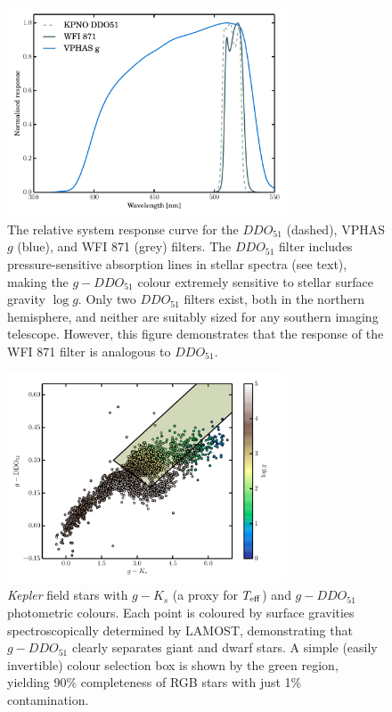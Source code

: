\documentclass[a4paper]{article}
\begin{document}
\begin{SupportingMaterial}

\begin{figure}
\includegraphics[width=8.3cm,angle=0,clip=true]{filter-response}
\caption{\label{image1} The relative system response curve for the $DDO_{51}$ (dashed), VPHAS $g$ (blue), and WFI 871 (grey) filters. The $DDO_{51}$ filter includes pressure-sensitive absorption lines in stellar spectra (see text), making the $g-DDO_{51}$ colour extremely sensitive to stellar surface gravity $\log{g}$. Only two $DDO_{51}$ filters exist, both in the northern hemisphere, and neither are suitably sized for any southern imaging telescope. However, this figure demonstrates that the response of the WFI 871 filter is analogous to $DDO_{51}$.}
\end{figure}


\begin{figure}
\includegraphics[width=8.3cm,angle=0,clip=true]{giant-selection}
\caption{\label{image2} \textit{Kepler} field stars with $g-K_s$ (a proxy for $T_{\rm eff}$) and $g-DDO_{51}$ photometric colours. Each point is coloured by surface gravities spectroscopically determined by LAMOST, demonstrating that $g-DDO_{51}$ clearly separates giant and dwarf stars. A simple (easily invertible) colour selection box is shown by the green region, yielding 90\% completeness of RGB stars with just 1\% contamination.}
\end{figure}




\end{SupportingMaterial}
\end{document}
